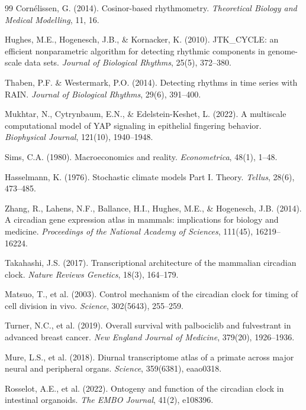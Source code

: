 \documentclass[11pt,letterpaper]{article}
\begin{document}
\begin{thebibliography}{99}
Corn{\'e}lissen, G. (2014).
Cosinor-based rhythmometry.
\textit{Theoretical Biology and Medical Modelling}, 11, 16.

Hughes, M.E., Hogenesch, J.B., \& Kornacker, K. (2010).
JTK\_CYCLE: an efficient nonparametric algorithm for detecting rhythmic components in genome-scale data sets.
\textit{Journal of Biological Rhythms}, 25(5), 372--380.

Thaben, P.F. \& Westermark, P.O. (2014).
Detecting rhythms in time series with RAIN.
\textit{Journal of Biological Rhythms}, 29(6), 391--400.

Mukhtar, N., Cytrynbaum, E.N., \& Edelstein-Keshet, L. (2022).
A multiscale computational model of YAP signaling in epithelial fingering behavior.
\textit{Biophysical Journal}, 121(10), 1940--1948.

Sims, C.A. (1980).
Macroeconomics and reality.
\textit{Econometrica}, 48(1), 1--48.

Hasselmann, K. (1976).
Stochastic climate models Part I. Theory.
\textit{Tellus}, 28(6), 473--485.

Zhang, R., Lahens, N.F., Ballance, H.I., Hughes, M.E., \& Hogenesch, J.B. (2014).
A circadian gene expression atlas in mammals: implications for biology and medicine.
\textit{Proceedings of the National Academy of Sciences}, 111(45), 16219--16224.

Takahashi, J.S. (2017).
Transcriptional architecture of the mammalian circadian clock.
\textit{Nature Reviews Genetics}, 18(3), 164--179.

Matsuo, T., et al. (2003).
Control mechanism of the circadian clock for timing of cell division in vivo.
\textit{Science}, 302(5643), 255--259.

Turner, N.C., et al. (2019).
Overall survival with palbociclib and fulvestrant in advanced breast cancer.
\textit{New England Journal of Medicine}, 379(20), 1926--1936.

Mure, L.S., et al. (2018).
Diurnal transcriptome atlas of a primate across major neural and peripheral organs.
\textit{Science}, 359(6381), eaao0318.

Rosselot, A.E., et al. (2022).
Ontogeny and function of the circadian clock in intestinal organoids.
\textit{The EMBO Journal}, 41(2), e108396.

\end{thebibliography}
\end{document}
